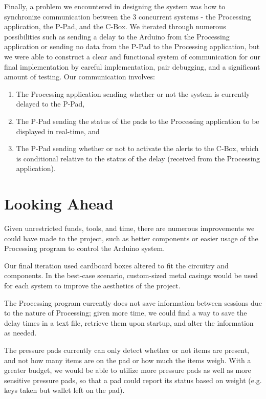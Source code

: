 \documentclass[10pt, oneside, letterpaper, titlepage]{article}
\begin{document}
		Finally, a problem we encountered in designing the system was how to synchronize communication between the 3 concurrent systems - the Processing application, the P-Pad, and the C-Box. We iterated through numerous possibilities such as sending a delay to the Arduino from the Processing application or sending no data from the P-Pad to the Processing application, but we were able to construct a clear and functional system of communication for our final implementation by careful implementation, pair debugging, and a significant amount of testing. Our communication involves:
		\begin{enumerate}
			\item The Processing application sending whether or not the system is currently delayed to the P-Pad,
			\item The P-Pad sending the status of the pads to the Processing application to be displayed in real-time, and
			\item The P-Pad sending whether or not to activate the alerts to the C-Box, which is conditional relative to the status of the delay (received from the Processing application).
		\end{enumerate}

	\clearpage
	\section{Looking Ahead}

		Given unrestricted funds, tools, and time, there are numerous improvements we could have made to the project, such as better components or easier usage of the Processing program to control the Arduino system.

		Our final iteration used cardboard boxes altered to fit the circuitry and components. In the best-case scenario, custom-sized metal casings would be used for each system to improve the aesthetics of the project.

		The Processing program currently does not save information between sessions due to the nature of Processing; given more time, we could find a way to save the delay times in a text file, retrieve them upon startup, and alter the information as needed.

		The pressure pads currently can only detect whether or not items are present, and not how many items are on the pad or how much the items weigh. With a greater budget, we would be able to utilize more pressure pads as well as more sensitive pressure pads, so that a pad could report its status based on weight (e.g. keys taken but wallet left on the pad).
\end{document}
